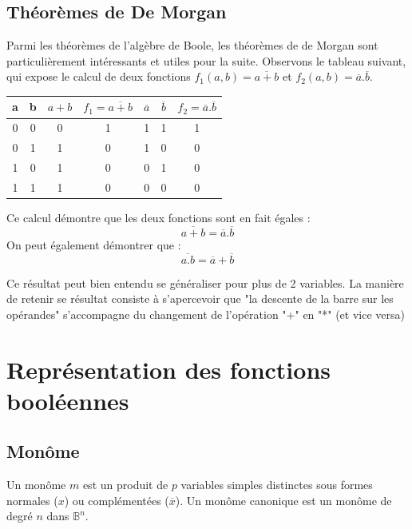 \subsection{Théorèmes de De Morgan}

Parmi les théorèmes de l'algèbre de Boole, les théorèmes de de Morgan sont particulièrement intéressants et utiles pour la suite.
Observons le tableau suivant, qui expose le calcul de deux fonctions $f_1(a,b)=\overline{a+b}$ et $f_2(a,b)=\overline{a}.\overline{b}$.

\begin{center}
   \begin{tabular}{|c|c|c|c|c|c|c| }
     \hline
     a & b & $a+b$ & $f_1=\overline{a+b}$ & $\overline{a}$ & $\overline{b}$ & $f_2=\overline{a}.\overline{b}$ \\ \hline \hline
     0 & 0 &     0 &                   1  &              1 &              1 &                              1  \\ \hline
     0 & 1 &     1 &                   0  &              1 &              0 &                              0  \\ \hline
     1 & 0 &     1 &                   0  &              0 &              1 &                              0  \\ \hline
     1 & 1 &     1 &                   0  &              0 &              0 &                              0  \\ \hline
   \end{tabular}
 \end{center}

Ce calcul démontre que les deux fonctions sont en fait égales :
$$\boxed{\overline{a+b}=\overline{a}.\overline{b}}$$
On peut également démontrer que :
$$\boxed{\overline{a.b}=\overline{a}+\overline{b}}$$

Ce résultat peut bien entendu se généraliser pour plus de 2 variables. La manière de retenir se résultat consiste à s'apercevoir que
"la descente de la barre sur les opérandes" s'accompagne du changement de l'opération "+" en "*" (et vice versa)

\section{Représentation des fonctions booléennes}

\subsection{Monôme}
Un monôme $m$ est un produit de $p$ variables simples distinctes sous formes normales ($x$) ou complémentées ($\overline{x}$). Un monôme canonique est un monôme de degré $n$ dans $\mathbb{B}
^n$.

